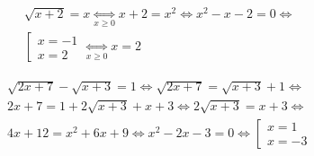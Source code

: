\begin{example}
    \begin{align*}
        &\sqrt{x + 2} = x \underset{x \ge 0}{\iff} x + 2 = x^2 \iff x^2 - x - 2 = 0 \iff \\
        &\left[\begin{array}{l}
            x = -1 \\
            x = 2
        \end{array}\right. \underset{x \ge 0}{\iff}
        x = 2
    \end{align*}
\end{example}

\begin{example}
    \begin{align*}
        &\sqrt{2x + 7} - \sqrt{x + 3} = 1 \iff \sqrt{2x + 7} = \sqrt{x + 3} + 1 \iff \\
        &2x + 7 = 1 + 2\sqrt{x + 3} + x + 3 \iff 2\sqrt{x + 3} = x + 3 \iff\\
        &4x + 12 = x^2 + 6x + 9 \iff x^2 - 2x - 3 = 0 \iff
        \left[\begin{array}{l}
            x = 1 \\
            x = -3
        \end{array}\right.
    \end{align*}
\end{example}